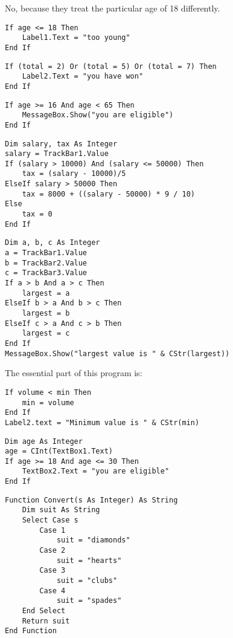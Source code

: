 		\begin{stab}
			\begin{enumChapter}
			
			\item	No, because they treat the particular age of 18 differently.
			\item
				\begin{lstlisting}
If age <= 18 Then
	Label1.Text = "too young"
End If
				\end{lstlisting}
			\item
				\begin{lstlisting}
If (total = 2) Or (total = 5) Or (total = 7) Then
	Label2.Text = "you have won"
End If
				\end{lstlisting}
			\item
				\begin{lstlisting}
If age >= 16 And age < 65 Then
	MessageBox.Show("you are eligible")
End If
				\end{lstlisting}
			\item
				\begin{lstlisting}
Dim salary, tax As Integer
salary = TrackBar1.Value
If (salary > 10000) And (salary <= 50000) Then
	tax = (salary - 10000)/5
ElseIf salary > 50000 Then
	tax = 8000 + ((salary - 50000) * 9 / 10)
Else
	tax = 0
End If
				\end{lstlisting}
			\item 
				\begin{lstlisting}
Dim a, b, c As Integer
a = TrackBar1.Value
b = TrackBar2.Value
c = TrackBar3.Value
If a > b And a > c Then
	largest = a
ElseIf b > a And b > c Then
	largest = b
ElseIf c > a And c > b Then
	largest = c
End If
MessageBox.Show("largest value is " & CStr(largest))
				\end{lstlisting}
			\item	The essential part of this program is:
				\begin{lstlisting}
If volume < min Then
	min = volume
End If
Label2.text = "Minimum value is " & CStr(min)
				\end{lstlisting}

			\item
				\begin{lstlisting}
Dim age As Integer
age = CInt(TextBox1.Text)
If age >= 18 And age <= 30 Then
	TextBox2.Text = "you are eligible"
End If
				\end{lstlisting}
			\item
				\begin{lstlisting}
Function Convert(s As Integer) As String
	Dim suit As String
	Select Case s
		Case 1
			suit = "diamonds"
		Case 2
			suit = "hearts"
		Case 3
			suit = "clubs"
		Case 4
			suit = "spades"
	End Select
	Return suit
End Function
				\end{lstlisting}
			\end{enumChapter}
		\end{stab}

